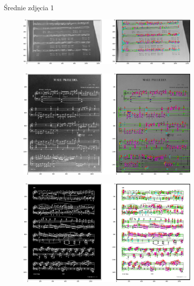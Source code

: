 \documentclass[12pt]{article}
\begin{document}
\begin{enumerate}
\begin{figure}[h!]
\begin{subfigure}[b]{0.48\linewidth}
				\end{subfigure}
				\label{fig:nuuty2}
				\caption{Średnie zdjęcia 1}
			\end{figure}
			\begin{figure}[h!]
				\centering
				\begin{subfigure}[b]{0.48\linewidth}
					\includegraphics[width=\linewidth]{Medium/Zdj10.png}
				\end{subfigure}
				\begin{subfigure}[b]{0.48\linewidth}
					\includegraphics[width=\linewidth]{Medium/Zdj11.png}
				\end{subfigure}
				\begin{subfigure}[b]{0.48\linewidth}
					\includegraphics[width=\linewidth]{Medium/Zdj12.png}

\end{subfigure}
\end{figure}
\end{enumerate}
\end{document}
